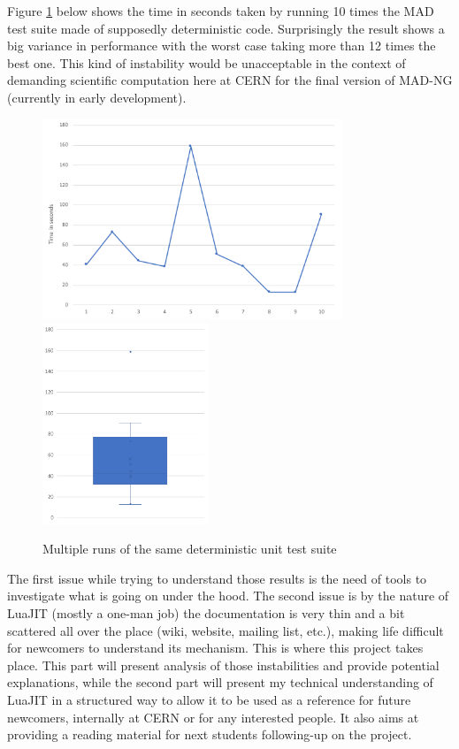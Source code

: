 
Figure \ref{fig:pb-statement} below shows the time in seconds taken by running 10
times the MAD test suite made of supposedly deterministic code. Surprisingly the
result shows a big variance in performance with the worst case taking more than
12 times the best one. This kind of instability would be unacceptable in the
context of demanding scientific computation here at CERN for the final version
of MAD-NG (currently in early development).

\begin{figure}[H]
    \centering
	\includegraphics[height=6cm]{./Images/pb-statement-curve.pdf}
	\includegraphics[height=6cm]{./Images/pb-statement-box.pdf}
    \caption{Multiple runs of the same deterministic unit test suite}
    \label{fig:pb-statement}
\end{figure}

The first issue while trying to understand those results is the need of tools
to investigate what is going on under the hood. The second issue is by the
nature of LuaJIT (mostly a one-man job) the documentation is very thin and a bit
scattered all over the place (wiki, website, mailing list, etc.), making life
difficult for newcomers to understand its mechanism.
This is where this project takes place. This part will present analysis of those
instabilities and provide potential explanations, while the second part
will present my technical understanding of LuaJIT in a structured way to allow
it to be used as a reference for future newcomers, internally at CERN or for any
interested people. It also aims at providing a reading material for next
students following-up on the project.
